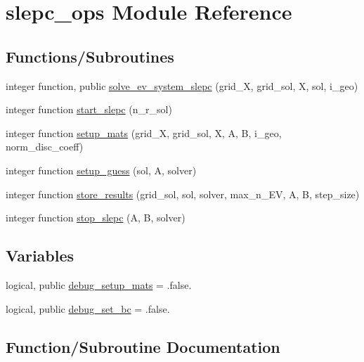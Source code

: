 \hypertarget{namespaceslepc__ops}{}\section{slepc\+\_\+ops Module Reference}
\label{namespaceslepc__ops}
\subsection*{Functions/\+Subroutines}
\begin{DoxyCompactItemize}
\item 
integer function, public \hyperlink{namespaceslepc__ops_ad9d4a9b7275ac5a6b9b35e481a7c1710}{solve\+\_\+ev\+\_\+system\+\_\+slepc} (grid\+\_\+X, grid\+\_\+sol, X, sol, i\+\_\+geo)
\item 
integer function \hyperlink{namespaceslepc__ops_a5f69f9325197c270c7975f01360a9648}{start\+\_\+slepc} (n\+\_\+r\+\_\+sol)
\item 
integer function \hyperlink{namespaceslepc__ops_af8aa2b9b7c5154ebd595afce3f5ebcd0}{setup\+\_\+mats} (grid\+\_\+X, grid\+\_\+sol, X, A, B, i\+\_\+geo, norm\+\_\+disc\+\_\+coeff)
\item 
integer function \hyperlink{namespaceslepc__ops_a6f6de293e91e94dc92eb6eab0525a96e}{setup\+\_\+guess} (sol, A, solver)
\item 
integer function \hyperlink{namespaceslepc__ops_a66241540803bca208b2f3bd6b0448491}{store\+\_\+results} (grid\+\_\+sol, sol, solver, max\+\_\+n\+\_\+\+EV, A, B, step\+\_\+size)
\item 
integer function \hyperlink{namespaceslepc__ops_ae65ae217581e4b5986da87bc9a23acb8}{stop\+\_\+slepc} (A, B, solver)
\end{DoxyCompactItemize}
\subsection*{Variables}
\begin{DoxyCompactItemize}
\item 
logical, public \hyperlink{namespaceslepc__ops_aff5aa0d485bc34e2f6e320172fcc4ccb}{debug\+\_\+setup\+\_\+mats} = .false.
\item 
logical, public \hyperlink{namespaceslepc__ops_ad57b5fd70608c1b97454963bdd1c4f5b}{debug\+\_\+set\+\_\+bc} = .false.
\end{DoxyCompactItemize}


\subsection{Function/\+Subroutine Documentation}
\mbox{\label{namespaceslepc__ops_a6f6de293e91e94dc92eb6eab0525a96e}} 

